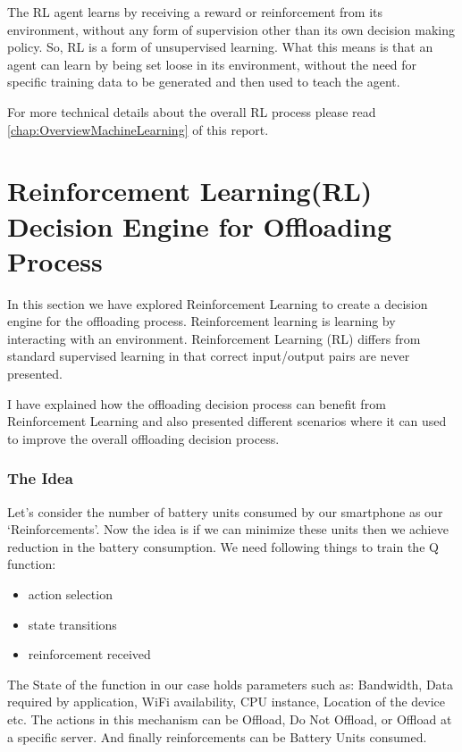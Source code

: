 \documentclass[12pt]{report}
\begin{document}
The RL agent learns by receiving a reward or reinforcement from its environment, without any form of supervision other than its own decision making policy. So, RL is a form of unsupervised learning. What this means is that an agent can learn by being set loose in its environment, without the need for specific training data to be generated and then used to teach the agent. 

For more technical details about the overall RL process please read \autoref{chap:OverviewMachineLearning} of this report.
\section{Reinforcement Learning(RL) Decision Engine for Offloading Process}
In this section we have explored Reinforcement Learning to create a decision engine for the offloading process. Reinforcement learning is learning by interacting with an environment. Reinforcement Learning (RL) differs from standard supervised learning in that correct input/output pairs are never presented. 

I have explained how the offloading decision process can benefit from Reinforcement Learning and also presented different scenarios where it can used to improve the overall offloading decision process. 
\subsubsection{The Idea}
Let's consider the number of battery units consumed by our smartphone as our `Reinforcements'. Now the idea is if we can minimize these units then we achieve reduction in the battery consumption.
We need following things to train the Q function:
\begin{itemize}
   \item action selection
   \item state transitions
   \item reinforcement received
\end{itemize}
The State of the function in our case holds parameters such as: Bandwidth, Data required by application, WiFi availability, CPU instance, Location of the device etc. The actions in this mechanism can be Offload, Do Not Offload, or Offload at a specific server. And finally reinforcements can be Battery Units consumed.\par
\end{document}
